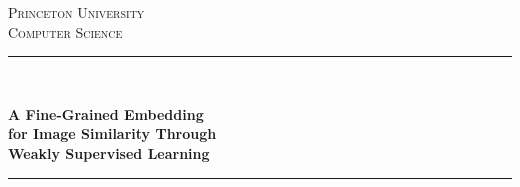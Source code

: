 \documentclass[11pt, notitlepage]{report}
\begin{document}
\hypersetup{pageanchor=false}
\begin{titlepage}

\newcommand{\HRule}{\rule{.8\linewidth}{0.5mm}} %
\renewenvironment{abstract}
 {\small
  \begin{center}
  \bfseries \abstractname\vspace{-.5em}\vspace{0pt}
  \end{center}
  \list{}{
    \setlength{\leftmargin}{.5cm}%
    \setlength{\rightmargin}{\leftmargin}%
  }%
  \item\relax}
 {\endlist}


\center %


\textsc{\LARGE Princeton University}\\[0.5cm] %
\textsc{\large Computer Science}\\[0.5cm] %

\vspace{2em}

\HRule \\[0.2cm]
{\Large \bfseries A Fine-Grained Embedding\\
for Image Similarity Through\\
Weakly Supervised Learning\\
\par}
\HRule \\[1.5cm]
 
\vspace{2em}


\end{titlepage}
\end{document}
